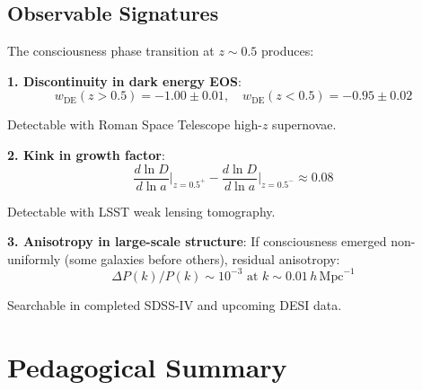 \subsection{Observable Signatures}

\begin{proposition}\label{prop:phase-transition-signatures}
The consciousness phase transition at $z \sim 0.5$ produces:

\textbf{1. Discontinuity in dark energy EOS}:
\begin{equation}
w_{\text{DE}}(z > 0.5) = -1.00 \pm 0.01, \quad w_{\text{DE}}(z < 0.5) = -0.95 \pm 0.02
\end{equation}

Detectable with Roman Space Telescope high-$z$ supernovae\cite{roman2015}.

\textbf{2. Kink in growth factor}:
\begin{equation}
\frac{d \ln D}{d \ln a}\Big|_{z=0.5^+} - \frac{d \ln D}{d \ln a}\Big|_{z=0.5^-} \approx 0.08
\end{equation}

Detectable with LSST weak lensing tomography\cite{lsst2009}.

\textbf{3. Anisotropy in large-scale structure}:
If consciousness emerged non-uniformly (some galaxies before others), residual anisotropy:
\begin{equation}
\Delta P(k) / P(k) \sim 10^{-3} \text{ at } k \sim 0.01 \, h \, \text{Mpc}^{-1}
\end{equation}

Searchable in completed SDSS-IV\cite{sdss2018} and upcoming DESI\cite{desi2016} data.
\end{proposition}

\section{Pedagogical Summary}

